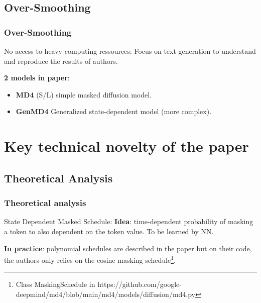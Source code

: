 \documentclass[10pt, aspectratio = 169]{beamer}
\begin{document}
\subsection{Over-Smoothing}
\begin{frame}
    \frametitle{Over-Smoothing}
    \begin{alertblock}{No access to heavy computing ressources:}
        Focus on text generation to understand and reproduce the results of authors.
    \end{alertblock}

    \textbf{2 models in paper}:
    \begin{itemize}
        \item \textbf{MD4} (S/L) simple masked diffusion model.
        \item \textbf{GenMD4} Generalized state-dependent model (more complex).

    \end{itemize}
\end{frame}

\section{Key technical novelty of the paper}

\subsection{Theoretical Analysis}



\begin{frame}
    \frametitle{Theoretical analysis}
    \begin{alertblock}{State Dependent Masked Schedule:}
        \textbf{Idea}: time-dependent probability of masking a token to also dependent on the token value.
        To be learned by NN.

        \textbf{In practice}: polynomial schedules are described in the paper but on their code, the authors only relies
        on the cosine masking schedule\footnote{Class MaskingSchedule in 
        https://github.com/google-deepmind/md4/blob/main/md4/models/diffusion/md4.py}.
    \end{alertblock}
\end{frame}


\end{document}
